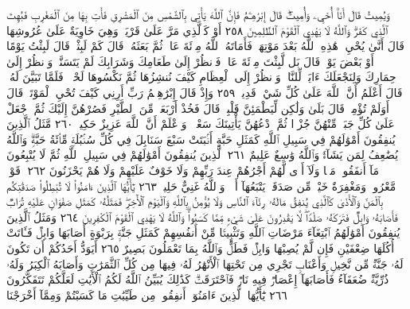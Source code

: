 وَيُمِيتُ قَالَ أَنَا۠ أُحْيِۦ وَأُمِيتُۖ قَالَ إِبْرَٰهِـۧمُ فَإِنَّ ٱللَّهَ يَأْتِي
بِٱلشَّمْسِ مِنَ ٱلْمَشْرِقِ فَأْتِ بِهَا مِنَ ٱلْمَغْرِبِ فَبُهِتَ ٱلَّذِي
كَفَرَۗ وَٱللَّهُ لَا يَهْدِي ٱلْقَوْمَ ٱلظَّٰلِمِينَ ٢٥٨ أَوْ كَٱلَّذِي
مَرَّ عَلَىٰ قَرْيَةࣲ وَهِيَ خَاوِيَةٌ عَلَىٰ عُرُوشِهَا قَالَ أَنَّىٰ يُحْيِۦ
هَٰذِهِ ٱللَّهُ بَعْدَ مَوْتِهَاۖ فَأَمَاتَهُ ٱللَّهُ مِا۟ئَةَ عَامࣲ ثُمَّ بَعَثَهُۥۖ
قَالَ كَمْ لَبِثْتَۖ قَالَ لَبِثْتُ يَوْمًا أَوْ بَعْضَ يَوْمࣲۖ قَالَ بَل
لَّبِثْتَ مِا۟ئَةَ عَامࣲ فَٱنظُرْ إِلَىٰ طَعَامِكَ وَشَرَابِكَ لَمْ يَتَسَنَّهْۖ
وَٱنظُرْ إِلَىٰ حِمَارِكَ وَلِنَجْعَلَكَ ءَايَةࣰ لِّلنَّاسِۖ وَٱنظُرْ إِلَى
ٱلْعِظَامِ كَيْفَ نُنشِزُهَا ثُمَّ نَكْسُوهَا لَحْمࣰاۚ فَلَمَّا
تَبَيَّنَ لَهُۥ قَالَ أَعْلَمُ أَنَّ ٱللَّهَ عَلَىٰ كُلِّ شَيْءࣲ قَدِيرࣱ ٢٥٩
وَإِذْ قَالَ إِبْرَٰهِـۧمُ رَبِّ أَرِنِي كَيْفَ تُحْيِ ٱلْمَوْتَىٰۖ قَالَ أَوَلَمْ
تُؤْمِنۖ قَالَ بَلَىٰ وَلَٰكِن لِّيَطْمَئِنَّ قَلْبِيۖ قَالَ فَخُذْ أَرْبَعَةࣰ مِّنَ
ٱلطَّيْرِ فَصُرْهُنَّ إِلَيْكَ ثُمَّ ٱجْعَلْ عَلَىٰ كُلِّ جَبَلࣲ مِّنْهُنَّ جُزْءࣰا
ثُمَّ ٱدْعُهُنَّ يَأْتِينَكَ سَعْيࣰاۚ وَٱعْلَمْ أَنَّ ٱللَّهَ عَزِيزٌ حَكِيمࣱ ٢٦٠
مَّثَلُ ٱلَّذِينَ يُنفِقُونَ أَمْوَٰلَهُمْ فِي سَبِيلِ ٱللَّهِ كَمَثَلِ حَبَّةٍ
أَنۢبَتَتْ سَبْعَ سَنَابِلَ فِي كُلِّ سُنۢبُلَةࣲ مِّا۟ئَةُ حَبَّةࣲۗ وَٱللَّهُ
يُضَٰعِفُ لِمَن يَشَآءُۚ وَٱللَّهُ وَٰسِعٌ عَلِيمٌ ٢٦١ ٱلَّذِينَ يُنفِقُونَ
أَمْوَٰلَهُمْ فِي سَبِيلِ ٱللَّهِ ثُمَّ لَا يُتْبِعُونَ مَآ أَنفَقُوا۟ مَنࣰّا وَلَآ
أَذࣰى لَّهُمْ أَجْرُهُمْ عِندَ رَبِّهِمْ وَلَا خَوْفٌ عَلَيْهِمْ وَلَا هُمْ
يَحْزَنُونَ ٢٦٢۞ قَوْلࣱ مَّعْرُوفࣱ وَمَغْفِرَةٌ خَيْرࣱ مِّن صَدَقَةࣲ
يَتْبَعُهَآ أَذࣰىۗ وَٱللَّهُ غَنِيٌّ حَلِيمࣱ ٢٦٣ يَٰٓأَيُّهَا ٱلَّذِينَ ءَامَنُوا۟
لَا تُبْطِلُوا۟ صَدَقَٰتِكُم بِٱلْمَنِّ وَٱلْأَذَىٰ كَٱلَّذِي يُنفِقُ مَالَهُۥ
رِئَآءَ ٱلنَّاسِ وَلَا يُؤْمِنُ بِٱللَّهِ وَٱلْيَوْمِ ٱلْأٓخِرِۖ فَمَثَلُهُۥ كَمَثَلِ
صَفْوَانٍ عَلَيْهِ تُرَابࣱ فَأَصَابَهُۥ وَابِلࣱ فَتَرَكَهُۥ صَلْدࣰاۖ لَّا يَقْدِرُونَ
عَلَىٰ شَيْءࣲ مِّمَّا كَسَبُوا۟ۗ وَٱللَّهُ لَا يَهْدِي ٱلْقَوْمَ ٱلْكَٰفِرِينَ ٢٦٤
وَمَثَلُ ٱلَّذِينَ يُنفِقُونَ أَمْوَٰلَهُمُ ٱبْتِغَآءَ مَرْضَاتِ ٱللَّهِ
وَتَثْبِيتࣰا مِّنْ أَنفُسِهِمْ كَمَثَلِ جَنَّةِۭ بِرَبْوَةٍ أَصَابَهَا وَابِلࣱ
فَـَٔاتَتْ أُكُلَهَا ضِعْفَيْنِ فَإِن لَّمْ يُصِبْهَا وَابِلࣱ فَطَلࣱّۗ
وَٱللَّهُ بِمَا تَعْمَلُونَ بَصِيرٌ ٢٦٥ أَيَوَدُّ أَحَدُكُمْ أَن تَكُونَ لَهُۥ
جَنَّةࣱ مِّن نَّخِيلࣲ وَأَعْنَابࣲ تَجْرِي مِن تَحْتِهَا ٱلْأَنْهَٰرُ لَهُۥ
فِيهَا مِن كُلِّ ٱلثَّمَرَٰتِ وَأَصَابَهُ ٱلْكِبَرُ وَلَهُۥ ذُرِّيَّةࣱ
ضُعَفَآءُ فَأَصَابَهَآ إِعْصَارࣱ فِيهِ نَارࣱ فَٱحْتَرَقَتْۗ كَذَٰلِكَ
يُبَيِّنُ ٱللَّهُ لَكُمُ ٱلْأٓيَٰتِ لَعَلَّكُمْ تَتَفَكَّرُونَ ٢٦٦ يَٰٓأَيُّهَا
ٱلَّذِينَ ءَامَنُوٓا۟ أَنفِقُوا۟ مِن طَيِّبَٰتِ مَا كَسَبْتُمْ وَمِمَّآ أَخْرَجْنَا
